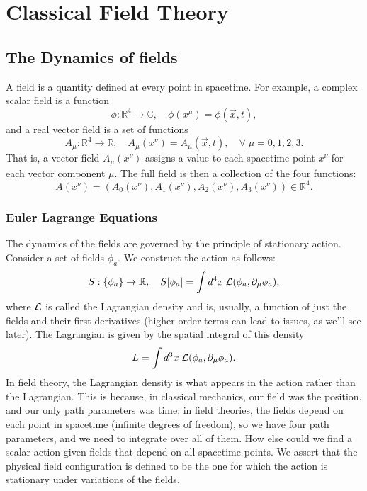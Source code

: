 \section{Classical Field Theory}
\subsection{The Dynamics of fields}
A field is a quantity defined at every point in spacetime. For example, a complex scalar field is a function 
\[
    \phi: \mathbb{R}^4\rightarrow \mathbb{C},\quad\phi(x^\mu)=\phi(\vec{x},t),
\]
and a real vector field is a set of functions
\[
    A_\mu: \mathbb{R}^4\rightarrow \mathbb{R},\quad A_\mu(x^\nu)=A_\mu(\vec{x},t), \quad\forall\;\mu=0,1,2,3.
\]
That is, a vector field $A_\mu(x^\nu)$ assigns a value to each spacetime point $x^\nu$ for each vector component $\mu$. The full field is then a collection of the four functions:
\[
    A(x^\nu) = (A_0(x^\nu),A_1(x^\nu),A_2(x^\nu), A_3(x^\nu))\in \mathbb{R}^4.
\]
\subsubsection{Euler Lagrange Equations}
The dynamics of the fields are governed by the principle of stationary action. Consider a set of fields $\phi_a$. We construct the action as follows:
\[
    S:\{\phi_a\}\rightarrow\mathbb{R}, \quad S[\phi_a] = \int d^4x \;\mathcal{L}(\phi_a,\partial_\mu \phi_a),
\]
where $\mathcal{L}$ is called the Lagrangian density and is, usually, a function of just the fields and their first derivatives (higher order terms can lead to issues, as we'll see later). The Lagrangian is given by the spatial integral of this density
\[
    L = \int d^3x\; \mathcal{L}(\phi_a, \partial_\mu\phi_a).
\]
In field theory, the Lagrangian density is what appears in the action rather than the Lagrangian. This is because, in classical mechanics, our field was the position, and our only path parameters was time; in field theories, the fields depend on each point in spacetime (infinite degrees of freedom), so we have four path parameters, and we need to integrate over all of them. How else could we find a scalar action given fields that depend on all spacetime points. We assert that the physical field configuration is defined to be the one for which the action is stationary under variations of the fields.\\

